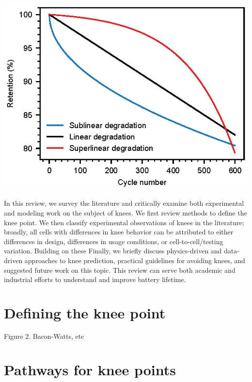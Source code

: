 \documentclass{article}
\begin{document}
{
\centering
\includegraphics[scale=1]{figures/degradation_rates.eps}
}

In this review, we survey the literature and critically examine both experimental and modeling work on the subject of knees. We first review methods to define the knee point. We then classify experimental observations of knees in the literature; broadly, all cells with differences in knee behavior can be attributed to either differences in design, differences in usage conditions, or cell-to-cell/testing variation. Building on these Finally, we briefly discuss physics-driven and data-driven approaches to knee prediction, practical guidelines for avoiding knees, and suggested future work on this topic. This review can serve both academic and industrial efforts to understand and improve battery lifetime.

\section{Defining the knee point}

Figure 2. Bacon-Watts, etc

\section{Pathways for knee points}
\end{document}

